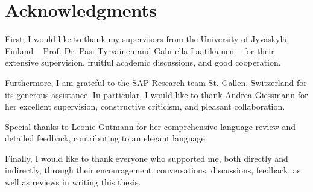 \chapter*{Acknowledgments}\label{ch:Acknowledgments}
\thispagestyle{empty}

First, I would like to thank my supervisors from the University of \linebreak Jyv\"askyl\"a, Finland -- Prof. Dr. Pasi Tyrv\"ainen and Gabriella Laatikainen -- for their extensive supervision, fruitful academic discussions, and good cooperation.

\vspace{0.5cm}
\noindent
Furthermore, I am grateful to the SAP Research team St. Gallen, Switzerland for its generous assistance. In particular, I would like to thank \mbox{Andrea} \mbox{Giessmann} for her excellent supervision, constructive criticism, and pleasant collaboration.

\vspace{0.5cm}
\noindent
Special thanks to Leonie Gutmann for her comprehensive language review and detailed feedback, contributing to an elegant language.

\vspace{0.5cm}
\noindent
Finally, I would like to thank everyone who supported me, both directly and indirectly, through their encouragement, conversations, discussions, feedback, as well as reviews in writing this thesis.